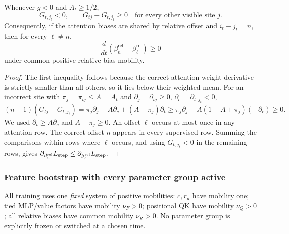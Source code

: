 \begin{lrlemma}
\label{lem:lr-postrouting-gradient}
Whenever $g<0$ and $A_t\ge1/2$,
\begin{equation}\label{eq:lr-score-comparison}
 G_{t,j_t}<0,\qquad G_{tj}-G_{t,j_t}\ge0
 \quad\text{for every other visible site }j.
\end{equation}
Consequently, if the attention biases are shared by relative offset and
$i_t-j_t=n$, then for every $\ell\ne n$,
\begin{equation}\label{eq:lr-bias-gap-mono}
 \frac{d}{dt}
 (\beta_n^{\mathrm{rel}}-\beta_\ell^{\mathrm{rel}})\ge0
\end{equation}
under common positive relative-bias mobility.
\end{lrlemma}
\begin{proof}
The first inequality follows because the correct attention-weight
derivative is strictly smaller than all others, so it lies below their
weighted mean.  For an incorrect site with $\pi_j=\pi_{tj}\le A=A_t$ and
$\partial_j=\partial_{tj}\ge0$, $\partial_c=\partial_{t,j_t}<0$,
\[
 (n-1)(G_{tj}-G_{t,j_t})
 =\pi_j\partial_j-A\partial_c+(A-\pi_j)\bar\partial_t
 \ge\pi_j\partial_j+A(1-A+\pi_j)(-\partial_c)\ge0.
\]
We used $\bar\partial_t\ge A\partial_c$ and $A-\pi_j\ge0$.
An offset $\ell$ occurs at most once in any attention row.  The correct
offset $n$ appears in every supervised row.  Summing the comparisons
within rows where $\ell$ occurs, and using $G_{t,j_t}<0$ in the
remaining rows, gives
$\partial_{\beta_n^{\mathrm{rel}}}L_{\mathrm{step}}
\le\partial_{\beta_\ell^{\mathrm{rel}}}L_{\mathrm{step}}$.
\end{proof}

\subsubsection{Feature bootstrap with every parameter group active}
\label{app:weak-routing-bootstrap}

All training uses one \emph{fixed} system of positive mobilities:
$c,r_u$ have mobility one; tied MLP/value factors have mobility
$\nu_F>0$; positional QK have mobility $\nu_Q>0$; all relative biases
have common mobility $\nu_R>0$.
No parameter group is explicitly frozen or switched at a chosen time.

